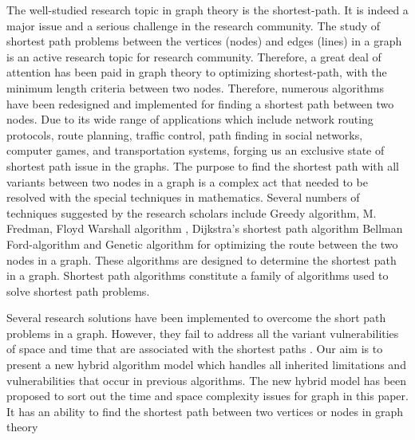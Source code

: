 \documentclass[10pt]{NSP1}
\begin{document}
\par\vspace{6.0pt}\vspace{12.0pt}

The well-studied research topic in graph theory is the shortest-path. It is indeed a major issue and a serious challenge in the research community. The study of shortest path problems between the vertices (nodes) and edges (lines) in a graph is an active research topic for research community. Therefore, a great deal of attention has been paid in graph theory to optimizing shortest-path, with the minimum length criteria between two nodes. Therefore, numerous algorithms have been redesigned and implemented for finding a shortest path between two nodes. Due to its wide range of applications which include network routing protocols, route planning, traffic control, path finding in social networks, computer games, and transportation systems, forging us an exclusive state of shortest path issue in the graphs. The purpose to find the shortest path with all variants between two nodes in a graph is a complex act that needed to be resolved with the special techniques in mathematics. Several numbers of techniques suggested by the research scholars include Greedy algorithm, M. Fredman, Floyd Warshall algorithm \cite{ref1, ref2}, Dijkstra’s shortest path algorithm \cite{ref3, ref4} Bellman Ford-algorithm \cite{ref5, ref6} and Genetic algorithm for optimizing the route between the two nodes in a graph. These algorithms are designed to determine the shortest path in a graph. Shortest path algorithms constitute a family of algorithms used to solve shortest path problems.

Several research solutions have been implemented to overcome the short path problems in a graph. However, they fail to address all the variant vulnerabilities of space and time that are associated with the shortest paths \cite{ref7, ref8}. Our aim is to present a new hybrid algorithm model which handles all inherited limitations and vulnerabilities that occur in previous algorithms. The new hybrid model has been proposed to sort out the time and space complexity issues for graph in this paper. It has an ability to find the shortest path between two vertices or nodes in graph theory

\par\medskip{}\smallskip
\end{document}
